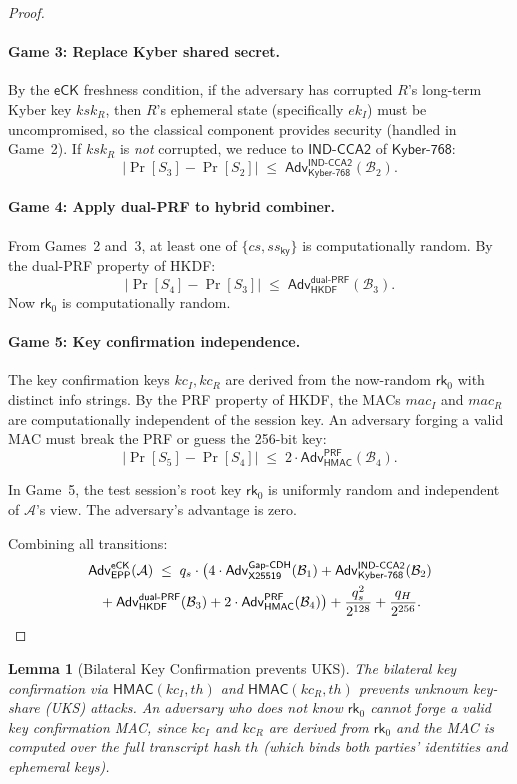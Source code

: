 \documentclass[11pt,a4paper]{article}
\newtheorem{lemma}[theorem]{Lemma}
\theoremstyle{definition}
\theoremstyle{remark}
\newcommand{\adv}{\mathsf{Adv}}
\newcommand{\advA}{\mathcal{A}}
\newcommand{\advB}{\mathcal{B}}
\newcommand{\HKDF}{\mathsf{HKDF}}
\newcommand{\HMAC}{\mathsf{HMAC}}
\renewcommand{\DH}{\mathsf{X25519}}
\newcommand{\KEM}{\mathsf{Kyber\text{-}768}}
\newcommand{\GapCDH}{\mathsf{Gap\text{-}CDH}}
\newcommand{\INDCCA}{\mathsf{IND\text{-}CCA2}}
\newcommand{\PRF}{\mathsf{PRF}}
\newcommand{\dualPRF}{\mathsf{dual\text{-}PRF}}
\newcommand{\eCK}{\mathsf{eCK}}
\newcommand{\rk}{\mathsf{rk}}
\begin{document}
\begin{proof}
\paragraph{Game 3: Replace Kyber shared secret.}
By the $\eCK$ freshness condition, if the adversary has corrupted $R$'s
long-term Kyber key $\mathit{ksk}_R$, then $R$'s ephemeral state (specifically
$ek_I$) must be uncompromised, so the classical component provides security
(handled in Game~2).  If $\mathit{ksk}_R$ is \emph{not} corrupted, we reduce
to $\INDCCA$ of $\KEM$:
\[
  |\Pr[S_3] - \Pr[S_2]| \;\leq\; \adv^{\INDCCA}_{\KEM}(\advB_2).
\]

\paragraph{Game 4: Apply dual-PRF to hybrid combiner.}
From Games~2 and~3, at least one of $\{\mathit{cs}, \mathit{ss}_{\mathsf{ky}}\}$
is computationally random.  By the dual-PRF property of HKDF:
\[
  |\Pr[S_4] - \Pr[S_3]| \;\leq\; \adv^{\dualPRF}_{\HKDF}(\advB_3).
\]
Now $\rk_0$ is computationally random.

\paragraph{Game 5: Key confirmation independence.}
The key confirmation keys $\mathit{kc}_I, \mathit{kc}_R$ are derived from the
now-random $\rk_0$ with distinct info strings.  By the PRF property of HKDF,
the MACs $\mathit{mac}_I$ and $\mathit{mac}_R$ are computationally independent
of the session key.  An adversary forging a valid MAC must break the PRF or
guess the 256-bit key:
\[
  |\Pr[S_5] - \Pr[S_4]| \;\leq\; 2 \cdot \adv^{\PRF}_{\HMAC}(\advB_4).
\]

In Game~5, the test session's root key $\rk_0$ is uniformly random and
independent of $\advA$'s view.  The adversary's advantage is zero.

Combining all transitions:
\begin{multline*}
  \adv^{\eCK}_{\mathsf{EPP}}(\advA) \;\leq\;
  q_s \cdot \bigl(4 \cdot \adv^{\GapCDH}_{\DH}(\advB_1) +
  \adv^{\INDCCA}_{\KEM}(\advB_2) \\
  {} + \adv^{\dualPRF}_{\HKDF}(\advB_3)
  + 2 \cdot \adv^{\PRF}_{\HMAC}(\advB_4)\bigr)
  + \frac{q_s^2}{2^{128}} + \frac{q_H}{2^{256}}. \qedhere
\end{multline*}
\end{proof}

\begin{lemma}[Bilateral Key Confirmation prevents UKS]
\label{lem:kc}
The bilateral key confirmation via $\HMAC(\mathit{kc}_I, \mathit{th})$ and
$\HMAC(\mathit{kc}_R, \mathit{th})$ prevents unknown key-share (UKS) attacks.
An adversary who does not know $\rk_0$ cannot forge a valid key confirmation
MAC, since $\mathit{kc}_I$ and $\mathit{kc}_R$ are derived from $\rk_0$ and
the MAC is computed over the full transcript hash $\mathit{th}$ (which binds
both parties' identities and ephemeral keys).
\end{lemma}
\end{document}
